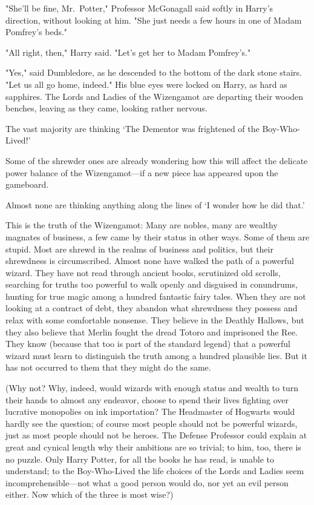 "She'll be fine, Mr.~Potter," Professor McGonagall said softly in Harry's 
direction, without looking at him. "She just needs a few hours in one of Madam 
Pomfrey's beds."

"All right, then," Harry said. "Let's get her to Madam Pomfrey's."

"Yes," said Dumbledore, as he descended to the bottom of the dark stone stairs. 
"Let us all go home, indeed." His blue eyes were locked on Harry, as hard as 
sapphires.
\sbreak
The Lords and Ladies of the Wizengamot are departing their wooden benches, 
leaving as they came, looking rather nervous.

The vast majority are thinking `The Dementor was frightened of the 
Boy-Who-Lived!'

Some of the shrewder ones are already wondering how this will affect the 
delicate power balance of the Wizengamot---if a new piece has appeared upon the 
gameboard.

Almost none are thinking anything along the lines of `I wonder how he did that.'

This is the truth of the Wizengamot: Many are nobles, many are wealthy magnates 
of business, a few came by their status in other ways. Some of them are stupid. 
Most are shrewd in the realms of business and politics, but their shrewdness is 
circumscribed. Almost none have walked the path of a powerful wizard. They have 
not read through ancient books, scrutinized old scrolls, searching for truths 
too powerful to walk openly and disguised in conundrums, hunting for true magic 
among a hundred fantastic fairy tales. When they are not looking at a contract 
of debt, they abandon what shrewdness they possess and relax with some 
comfortable nonsense. They believe in the Deathly Hallows, but they also 
believe that Merlin fought the dread Totoro and imprisoned the Ree. They know 
(because that too is part of the standard legend) that a powerful wizard must 
learn to distinguish the truth among a hundred plausible lies. But it has not 
occurred to them that they might do the same.

(Why not? Why, indeed, would wizards with enough status and wealth to turn 
their hands to almost any endeavor, choose to spend their lives fighting over 
lucrative monopolies on ink importation? The Headmaster of Hogwarts would 
hardly see the question; of course most people should not be powerful wizards, 
just as most people should not be heroes. The Defense Professor could explain 
at great and cynical length why their ambitions are so trivial; to him, too, 
there is no puzzle. Only Harry Potter, for all the books he has read, is unable 
to understand; to the Boy-Who-Lived the life choices of the Lords and Ladies 
seem incomprehensible---not what a good person would do, nor yet an evil person 
either. Now which of the three is most wise?)

